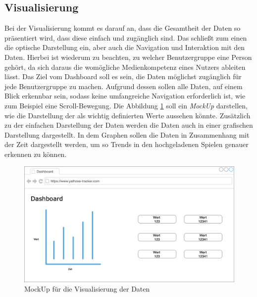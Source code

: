\subsection{Visualisierung} \label{sec:visualisation}
Bei der Visualisierung kommt es darauf an, dass die Gesamtheit der Daten so präsentiert wird, dass diese einfach und zugänglich sind. Das schließt zum einen die optische Darstellung ein, aber auch die Navigation und Interaktion mit den Daten. Hierbei ist wiederum zu beachten, zu welcher Benutzergruppe eine Person gehört, da sich daraus die womögliche Medienkompetenz eines Nutzers ableiten lässt. \cite{few_2013}
Das Ziel vom Dashboard soll es sein, die Daten möglichst zugänglich für jede Benutzergruppe zu machen. Aufgrund dessen sollen alle Daten, auf einem Blick erkennbar sein, sodass keine umfangreiche Navigation erforderlich ist, wie zum Beispiel eine Scroll-Bewegung.
Die Abbildung \ref{fig:mockup} soll ein \textit{MockUp} darstellen, wie die Darstellung der als wichtig definierten Werte aussehen könnte.
Zusätzlich zu der einfachen Darstellung der Daten werden die Daten auch in einer grafischen Darstellung dargestellt. In dem Graphen sollen die Daten in Zusammenhang mit der Zeit dargestellt werden, um so Trends in den hochgeladenen Spielen genauer erkennen zu können.

\begin{figure}[H]
	\centering
	\includegraphics[width=\imgMed]{images/practice/dashboard_mockup.png}
	\caption{MockUp für die Visualisierung der Daten}
	\label{fig:mockup}
\end{figure}
